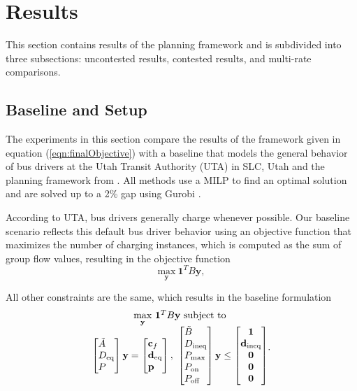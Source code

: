 \section{Results}
This section contains results of the planning framework and is subdivided into three subsections: uncontested results, contested results, and multi-rate comparisons.  
\subsection{\label{sec:setup} Baseline and Setup}
The experiments in this section compare the results of the framework given in equation (\ref{eqn:finalObjective}) with a baseline that models the general behavior of bus drivers at the Utah Transit Authority (UTA) in SLC, Utah and the planning framework from \cite{He_2022_Battery}. All methods use a MILP to find an optimal solution and are solved up to a 2\% gap using Gurobi \cite{gurobi}.
\par According to UTA, bus drivers generally charge whenever possible. Our baseline scenario reflects this default bus driver behavior using an objective function that maximizes the number of charging instances, which is computed as the sum of group flow values, resulting in the objective function
\begin{equation}
	\underset{\mathbf{y}}{\text{max}} \ \mathbf{1}^TB\mathbf{y},
\end{equation}
\par All other constraints are the same, which results in the baseline formulation 
\begin{equation}\label{eqn:finalBaselineObjective}
	\begin{matrix*}[c]
		\underset{\mathbf{y}}{\scalebox{1}{\text{max}}} \ \mathbf{1}^TB\mathbf{y} \ \text{subject to}\\
		\begin{bmatrix*}[l]
				\tilde{A} \\
				D_{\text{eq}} \\
				P
				\end{bmatrix*} \mathbf{y} = \begin{bmatrix*}[l]\mathbf{c}_f \\ \mathbf{d}_{\text{eq}}\\\mathbf{p} \end{bmatrix*}, \ \begin{bmatrix*}[l]
			\tilde{B} \\
			D_{\text{ineq}} \\ 
			P_{\text{max}} \\
			P_{\text{on}} \\
			P_{\text{off}}
			\end{bmatrix*}\mathbf{y} \le \begin{bmatrix*}\mathbf{1} \\ \mathbf{d}_{\text{ineq}} \\ \mathbf{0} \\ \mathbf{0} \\ \mathbf{0} \end{bmatrix*}
	\end{matrix*}.
\end{equation}
